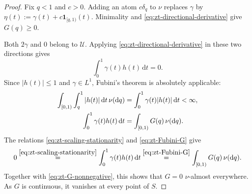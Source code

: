 \documentclass[10pt]{amsart}
\theoremstyle{definition}
\theoremstyle{remark}
\numberwithin{equation}{section}
\newcommand{\1}{\mathbf 1}
\newcommand{\cU}{\mathcal U}
\newcommand{\dd}{\,\mathrm d}
\newcommand{\stackref}[2]{\stackrel{#2}{#1}}
\begin{document}
\begin{proof}
Fix $q<1$ and $c>0$.  Adding an atom $c\delta_q$ to $\nu$ replaces $\gamma$ by $\eta(t):=\gamma(t)+c\1_{[q,1)}(t)$.  Minimality and \eqref{eq:zt-directional-derivative} give $G(q)\geq0$.

Both $2\gamma$ and $0$ belong to $\cU$.  Applying \eqref{eq:zt-directional-derivative} in these two directions gives
\begin{equation}
 \int_0^1\gamma(t)h(t)\dd t=0.
 \label{eq:zt-scaling-stationarity}
\end{equation}
Since $|h(t)|\leq1$ and $\gamma\in L^1$, Fubini's theorem is absolutely applicable:
\begin{align}
 \int_{[0,1)}\int_q^1|h(t)|\dd t\,\nu(\mathrm d q)
 &=\int_0^1\gamma(t)|h(t)|\dd t<\infty,                         \notag\\
 \int_0^1\gamma(t)h(t)\dd t
 &=\int_{[0,1)}G(q)\,\nu(\mathrm d q).                               \label{eq:zt-Fubini-G}
\end{align}
The relations \eqref{eq:zt-scaling-stationarity} and \eqref{eq:zt-Fubini-G} give
\begin{equation*}
 0
 \stackref{=}{\eqref{eq:zt-scaling-stationarity}}
 \int_0^1\gamma(t)h(t)\dd t
 \stackref{=}{\eqref{eq:zt-Fubini-G}}
 \int_{[0,1)}G(q)\,\nu(\mathrm d q).
\end{equation*}
Together with \eqref{eq:zt-G-nonnegative}, this shows that $G=0$ $\nu$-almost everywhere. As $G$ is continuous, it vanishes at every point of $S$.


\end{proof}
\end{document}
